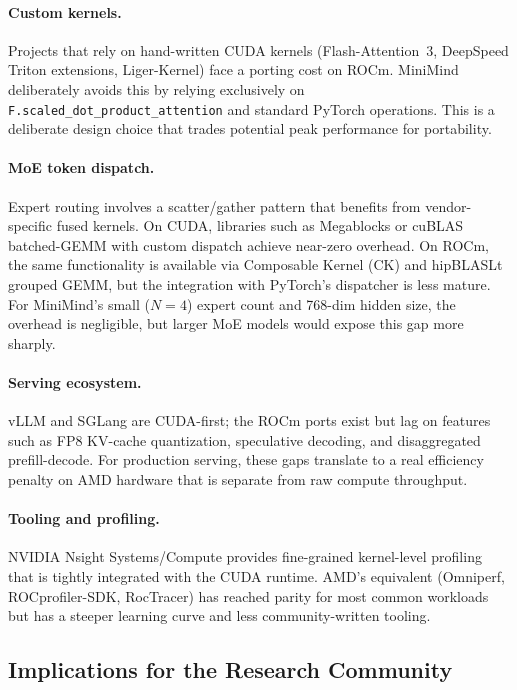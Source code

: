 \paragraph{Custom kernels.}
Projects that rely on hand-written CUDA kernels (Flash-Attention~3, DeepSpeed
Triton extensions, Liger-Kernel) face a porting cost on ROCm.  MiniMind
deliberately avoids this by relying exclusively on \texttt{F.scaled\_dot\_product\_attention}
and standard PyTorch operations.  This is a deliberate design choice that
trades potential peak performance for portability.

\paragraph{MoE token dispatch.}
Expert routing involves a scatter/gather pattern that benefits from
vendor-specific fused kernels.  On CUDA, libraries such as Megablocks or
cuBLAS batched-GEMM with custom dispatch achieve near-zero overhead.
On ROCm, the same functionality is available via Composable Kernel (CK) and
hipBLASLt grouped GEMM, but the integration with PyTorch's dispatcher is
less mature.  For MiniMind's small ($N{=}4$) expert count and 768-dim hidden
size, the overhead is negligible, but larger MoE models would expose this
gap more sharply.

\paragraph{Serving ecosystem.}
vLLM and SGLang are CUDA-first; the ROCm ports exist but lag on features
such as FP8 KV-cache quantization, speculative decoding, and disaggregated
prefill-decode.  For production serving, these gaps translate to a real
efficiency penalty on AMD hardware that is separate from raw compute throughput.

\paragraph{Tooling and profiling.}
NVIDIA Nsight Systems/Compute provides fine-grained kernel-level profiling
that is tightly integrated with the CUDA runtime.  AMD's equivalent
(Omniperf, ROCprofiler-SDK, RocTracer) has reached parity for most common
workloads but has a steeper learning curve and less community-written tooling.

\subsection{Implications for the Research Community}
\label{sec:discussion:implications}

